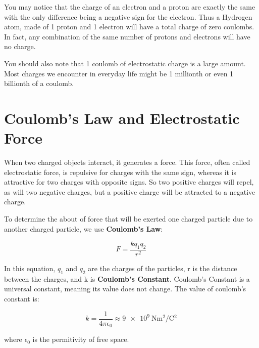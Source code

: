	You may notice that the charge of an electron and a proton are exactly the same with the only difference being a negative sign for the electron.  Thus a Hydrogen atom, made of 1 proton and 1 electron will have a total charge of zero coulombs.  In fact, any combination of the same number of protons and electrons will have no charge. 
	
	You should also note that 1 coulomb of electrostatic charge is a large amount.  Most charges we encounter in everyday life might be 1 millionth or even 1 billionth of a coulomb. 
	
	

	\section{Coulomb's Law and Electrostatic Force}  

When two charged objects interact, it generates a force.  This force, often called electrostatic force, is repulsive for charges with the same sign, whereas it is attractive for two charges with opposite signs.  So two positive charges will repel, as will two negative charges, but a positive charge will be attracted to a negative charge.  


To determine the about of force that will be exerted one charged particle due to another charged particle, we use \textbf{Coulomb's Law}: 
\begin{mdframed}[backgroundcolor=orange!20!white]

	\begin{equation}
	F = \frac{kq_1q_2}{r^2}
	\label{equation:coulombslaw}
	\end{equation}
\end{mdframed}	
	In this equation, $q_1$ and $q_2$ are the charges of the particles, r is the distance between the charges, and k is \textbf{Coulomb's Constant}.  Coulomb's Constant is a universal constant, meaning its value does not change.  The value of coulomb's constant is: 
	
		\begin{mdframed}[backgroundcolor=green!20!white]
		\begin{equation*}
			k  = \frac{1}{4\pi\epsilon_0}\approx \SI[per-mode = symbol]{9e9}{\N\m^2\per\coulomb^2}
			\label{equation:coulombsconstant}
		\end{equation*}
	\end{mdframed}	
	where $\epsilon_0$ is the permitivity of free space.
	
